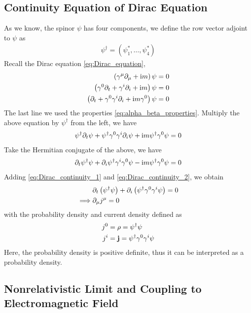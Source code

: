 \subsection{Continuity Equation of Dirac Equation}
As we know, the spinor $\psi$ has four components, we define the row vector adjoint to $\psi$ as
\begin{align*}
    \psi^ \dag = \left(\psi_1^* ,\dots , \psi^*_4\right)
\end{align*}
Recall the Dirac equation \cref{eq:Dirac_equation},
\begin{align*}
    \left( \gamma^ \mu \partial_ \mu + \mathrm{i} m \right) \psi = 0 \\ 
    \left( \gamma^0 \partial_ t + \gamma^ i \partial_ i + \mathrm{i} m \right) \psi = 0 \\
    \left( \partial_t + \gamma^0 \gamma^ i \partial_i + \mathrm{i} m \gamma^0 \right) \psi = 0 
\end{align*}
The last line we used the properties \cref{eq:alpha_beta_properties}. Multiply the above equation by $\psi^ \dag$ from the left, we have 
\begin{align}
    \psi^ \dag \partial_t \psi + \psi^ \dag \gamma^0 \gamma^ i \partial_i \psi + \mathrm{i} m \psi^ \dag \gamma^0 \psi = 0 \label{eq:Dirac_continuity_1}
\end{align}
Take the Hermitian conjugate of the above, we have 
\begin{align}
    \partial_t \psi^ \dag \psi + \partial_i \psi^ \dag \gamma^ i \gamma^0 \psi - \mathrm{i} m \psi^ \dag \gamma^0 \psi = 0 \label{eq:Dirac_continuity_2}
\end{align}
Adding \cref{eq:Dirac_continuity_1} and \cref{eq:Dirac_continuity_2}, we obtain
\begin{align*}
    & \partial_t \left(\psi^ \dag \psi\right) + \partial_i \left(\psi^ \dag \gamma^0 \gamma^ i \psi\right) = 0 \\
    \implies & \partial_ \mu j^ \mu = 0
\end{align*}
with the probability density and current density defined as
\begin{align}
    j^0 &= \rho = \psi^ \dag \psi \\
    j^i &= \mathbf{j} = \psi^ \dag \gamma^0 \gamma^ i \psi
\end{align}
Here, the probability density is positive definite, thus it can be interpreted as a probability density.

\subsection{Nonrelativistic Limit and Coupling to Electromagnetic Field}

